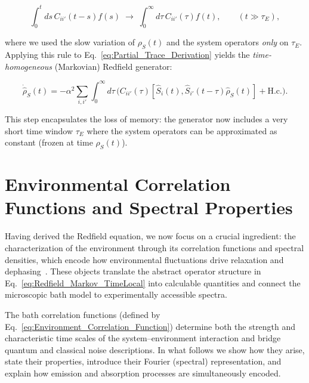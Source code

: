 \begin{equation}
	\int_0^t ds\, C_{ii'}(t-s) f(s) \; \longrightarrow \; \int_0^{\infty} d\tau\, C_{ii'}(\tau) f(t), \qquad (t \gg \tau_E),
	\label{eq:Markov_extension_rule}
\end{equation}

\noindent
where we used the slow variation of $\rho_S(t)$ and the system operators \textit{only} on $\tau_E$. 
Applying this rule to Eq.~\eqref{eq:Partial_Trace_Derivation} yields the \emph{time-homogeneous} (Markovian) Redfield generator:

\begin{equation}
	\boxed{
		\dot{\hat{\rho}}_S(t) = - \alpha^2 \sum_{i,i'} \int_0^{\infty} d\tau \, \Big( C_{ii'}(\tau) [\hat{S}_i(t), \hat{S}_{i'}(t-\tau) \hat{\rho}_S(t)] + \text{H.c.}\Big).
	}
	\label{eq:Redfield_Markov_TimeLocal}
\end{equation}

\noindent
This step encapsulates the loss of memory: the generator now includes a very short time window $\tau_E$ where the system operators can be approximated as constant (frozen at time $\rho_S(t)$).


\section{Environmental Correlation Functions and Spectral Properties}
\label{sec:environmental_correlation_functions}

\noindent
Having derived the Redfield equation, we now focus on a crucial ingredient: the characterization of the environment through its correlation functions and spectral densities, which encode how environmental fluctuations drive relaxation and dephasing~\cite{breuerpetruccione2009theoryopenquantum, weiss2012quantumdissipativesystems}. These objects translate the abstract operator structure in Eq.~\eqref{eq:Redfield_Markov_TimeLocal} into calculable quantities and connect the microscopic bath model to experimentally accessible spectra.

\noindent
The bath correlation functions (defined by Eq.~\eqref{eq:Environment_Correlation_Function}) determine both the strength and characteristic time scales of the system--environment interaction and bridge quantum and classical noise descriptions. In what follows we show how they arise, state their properties, introduce their Fourier (spectral) representation, and explain how emission and absorption processes are simultaneously encoded.


